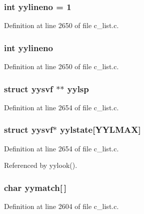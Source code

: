 \subsubsection{\setlength{\rightskip}{0pt plus 5cm}int \bf{yylineno} = 1}\label{c__list_8c_5e36364965360da7b7cdfc2188e0af84}




Definition at line 2650 of file c\_\-list.c.
\subsubsection{\setlength{\rightskip}{0pt plus 5cm}int \bf{yylineno}}\label{c__list_8c_5e36364965360da7b7cdfc2188e0af84}




Definition at line 2650 of file c\_\-list.c.
\subsubsection{\setlength{\rightskip}{0pt plus 5cm}struct \bf{yysvf} $\ast$$\ast$ \bf{yylsp}}\label{c__list_8c_73a1886259f2d6f6fb1e493c9775adf5}




Definition at line 2654 of file c\_\-list.c.
\subsubsection{\setlength{\rightskip}{0pt plus 5cm}struct \bf{yysvf}$\ast$ \bf{yylstate}[YYLMAX]}\label{c__list_8c_d22325dc0887c43d7e63b21ad8659e6a}




Definition at line 2654 of file c\_\-list.c.

Referenced by yylook().
\subsubsection{\setlength{\rightskip}{0pt plus 5cm}char \bf{yymatch}[$\,$]}\label{c__list_8c_8043df7c7db8b5a6a86a6e34340d8d86}




Definition at line 2604 of file c\_\-list.c.
